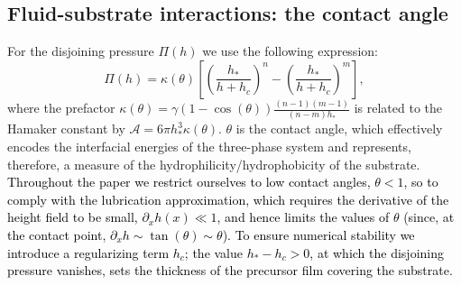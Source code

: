 \subsection{Fluid-substrate interactions: the contact angle}\label{subsec:fluid_substrate}
For the disjoining pressure $\Pi(h)$ we use the following 
expression\textcolor{black}{\cite{crasterDynamicsStabilityThin2009, peschkaSignaturesSlipDewetting2019, nesicFullyNonlinearDynamics2015, oronLongscaleEvolutionThin1997}}:
\begin{equation}\label{eq:disjoin_p}
    \Pi(h) = \kappa(\theta) \left[\left(\frac{h_{\ast}}{h+h_c}\right)^n - \left(\frac{h_{\ast}}{h+h_c}\right)^m\right],
\end{equation}
where the prefactor $\kappa(\theta) = \gamma(1-\cos(\theta))\frac{(n-1)(m-1)}{(n-m)h_{\ast}}$ is related to the Hamaker constant by
$\mathcal{A} = 6 \pi h_{\ast}^3 \kappa(\theta)$.
$\theta$ is the contact angle, which effectively encodes the interfacial energies of the three-phase system and represents, therefore, a measure of the hydrophilicity/hydrophobicity of the substrate.
\textcolor{black}{Throughout the paper we restrict ourselves to low contact angles, $\theta < 1$,
so to comply with the lubrication approximation, which requires the derivative of the height field to be small, $\partial_x h(x) \ll 1$, and hence limits
the values of $\theta$ (since, at the contact point, $\partial_x h \sim \tan(\theta) \sim \theta$).}
\textcolor{black}{To ensure numerical stability we introduce a regularizing term $h_c$; the value $h_{\ast} - h_c > 0$, 
at which the disjoining pressure vanishes, sets the thickness of the precursor film covering the substrate.}

